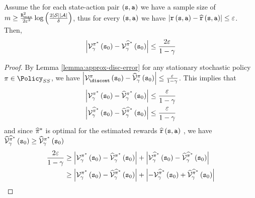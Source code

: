 \begin{theorem}
\label{thm:approx-model-disc}
%
Assume the for each state-action pair $\left({\tt s},{\tt a}\right)$ we have
a sample size of $m\geq\frac{{\tt R}_{\max }^{2}}{2\varepsilon^{2}}\log\left(\frac{2\left|\mathcal{S}\right|\left|\mathcal{A}\right|}{\delta}\right)$,
thus for every $\left({\tt s},{\tt a}\right)$ we have $\left|{\tt r}\left({\tt s},{\tt a}\right)-\widehat{{\tt r}}\left({\tt s},{\tt a}\right)\right|\leq\varepsilon$.
Then,
\[
\left|\mathcal{V}_{\gamma}^{\pi^{*}}\left({\tt s}_{0}\right)-\mathcal{V}_{\gamma}^{\widehat{\pi}^{*}}\left({\tt s}_{0}\right)\right|\leq\frac{2\varepsilon}{1-\gamma}
\]
\end{theorem}

\begin{proof}
By Lemma \ref{lemma:approx-disc-error} for any stationary stochastic policy $\policy\in\Policy_{SS}$, we have
$\left|\Value_{\discont}^{\policy}\left(\state_{0}\right)-\widehat{\Value}_{\discount}^{\policy}\left(\state_{0}\right)\right|\leq\frac{\varepsilon}{1-\discount}$.
This implies that
\begin{align*}
	\left|\mathcal{V}_{\gamma}^{\pi^{*}}\left({\tt s}_{0}\right)-\widehat{\mathcal{V}}_{\gamma}^{\pi^{*}}\left({\tt s}_{0}\right)\right| & \leq\frac{\varepsilon}{1-\gamma}\\
	\left|\mathcal{V}_{\gamma}^{\widehat{\pi}^{*}}\left({\tt s}_{0}\right)-\widehat{\mathcal{V}}_{\gamma}^{\widehat{\pi}^{*}}\left({\tt s}_{0}\right)\right| & \leq\frac{\varepsilon}{1-\gamma}
\end{align*}
and since $\widehat{\pi}^{*}$ is optimal for the estimated rewards
$\widehat{{\tt r}}\left({\tt s},{\tt a}\right)$ , we have $\widehat{\mathcal{V}}_{\gamma}^{\widehat{\pi}^{*}}\left({\tt s}_{0}\right)\geq\widehat{\mathcal{V}}_{\gamma}^{\pi^{*}}\left({\tt s}_{0}\right)$
\begin{align*}
\frac{2\varepsilon}{1-\discount} & \geq\left|\Value_{\discount}^{\policy^{*}}\left(\state_{0}\right)-\widehat{\Value}_{\discount}^{\policy^{*}}\left(\state_{0}\right)\right|+\left|\Value_{\discount}^{\widehat{\policy}^{*}}\left(\state_{0}\right)-\widehat{\Value}_{\discount}^{\widehat{\policy}^{*}}\left(\state_{0}\right)\right|\\
& \geq\left|\Value_{\discount}^{\policy^{*}}\left(\state_{0}\right)-\widehat{\Value}_{\discount}^{\widehat{\policy}^{*}}\left(\state_{0}\right)\right|+\left|-\Value_{\discount}^{\widehat{\policy}^{*}}\left(\state_{0}\right)+\widehat{\Value}_{\discount}^{\widehat{\policy}^{*}}\left(\state_{0}\right)\right|\\

\end{align*}
\end{proof}
